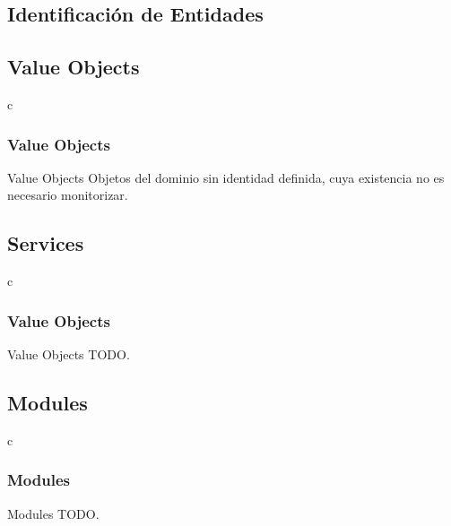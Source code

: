 \documentclass[a4paper,slidestop,xcolor=pst,dvips,blue]{beamer}
\begin{document}
\subsection{Identificación de Entidades}

%
%
\subsection{Value Objects}

\begin{frame}{c}
    \frametitle{Value Objects}
    \begin{block}{Value Objects}
    Objetos del dominio sin identidad definida, cuya existencia no es necesario monitorizar.
    \end{block}
\end{frame}

\subsection{Services}

\begin{frame}{c}
    \frametitle{Value Objects}
    \begin{block}{Value Objects}
    TODO.
    \end{block}
\end{frame}

\subsection{Modules}

\begin{frame}{c}
    \frametitle{Modules}
    \begin{block}{Modules}
    TODO.
    \end{block}
\end{frame}
\end{document}
